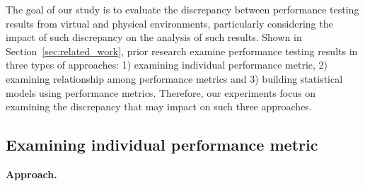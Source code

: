 The goal of our study is to evaluate the discrepancy between performance testing results from virtual and physical environments, particularly considering the impact of such discrepancy on the analysis of such results. Shown in Section~\ref{sec:related_work}, prior research examine performance testing results in three types of approaches: 1) examining individual performance metric, 2) examining relationship among performance metrics and 3) building statistical models using performance metrics. Therefore, our experiments focus on examining the discrepancy that may impact on such three approaches. 



\subsection{Examining individual performance metric}
\label{sec:individual}
\noindent \textbf{Approach.} 

